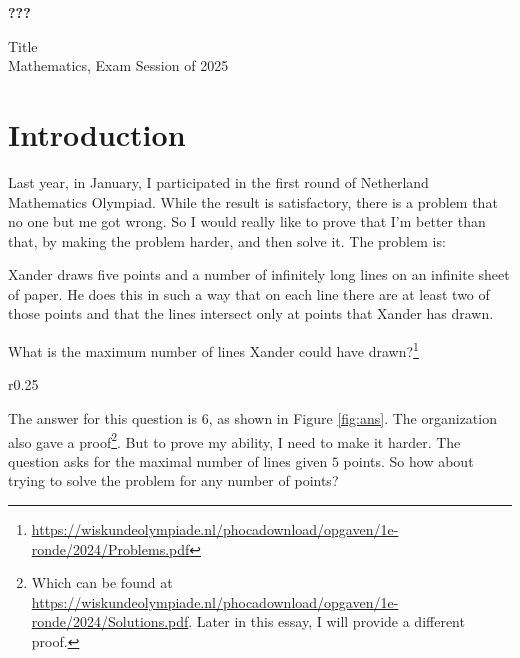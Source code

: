 \documentclass[a4paper, 12pt]{article}
\begin{document}
\begin{titlepage}
\begin{center}
\vspace*{4cm}
{\huge\textbf{???}}
\end{center}
\vspace{1cm}
\begin{flushright}
Title\\
Mathematics, Exam Session of 2025\\
\end{flushright}
\end{titlepage}

\tableofcontents
\clearpage

\section{Introduction}
Last year, in January, I participated in the  first round of Netherland Mathematics Olympiad. While the result is satisfactory, there is a problem that no one but me got wrong. So I would really like to prove that I'm better than that, by making the problem harder, and then solve it.
The problem is:

\begin{displayquote}
Xander draws five points and a number of infinitely long lines on an infinite sheet of paper. He does this in such a way that on each line there are at least two of those points and that the lines intersect only at points that Xander has drawn.

What is the maximum number of lines Xander could have drawn?\footnote{\href{https://wiskundeolympiade.nl/phocadownload/opgaven/1e-ronde/2024/Problems.pdf}{https://wiskundeolympiade.nl/phocadownload/opgaven/1e-ronde/2024/Problems.pdf}}
\end{displayquote}

\begin{wrapfigure}{r}{0.25\textwidth}
    
    \caption{answer to the original problem}
    \label{fig:ans}
\end{wrapfigure}
The answer for this question is $6$, as shown in Figure \ref{fig:ans}. The organization also gave a proof\footnote{Which can be found at \href{https://wiskundeolympiade.nl/phocadownload/opgaven/1e-ronde/2024/Solutions.pdf}{https://wiskundeolympiade.nl/phocadownload/opgaven/1e-ronde/2024/Solutions.pdf}. Later in this essay, I will provide a different proof.}. But to prove my ability, I need to make it harder. The question asks for the maximal number of lines given $5$ points. So how about trying to solve the problem for any number of points?
\end{document}
